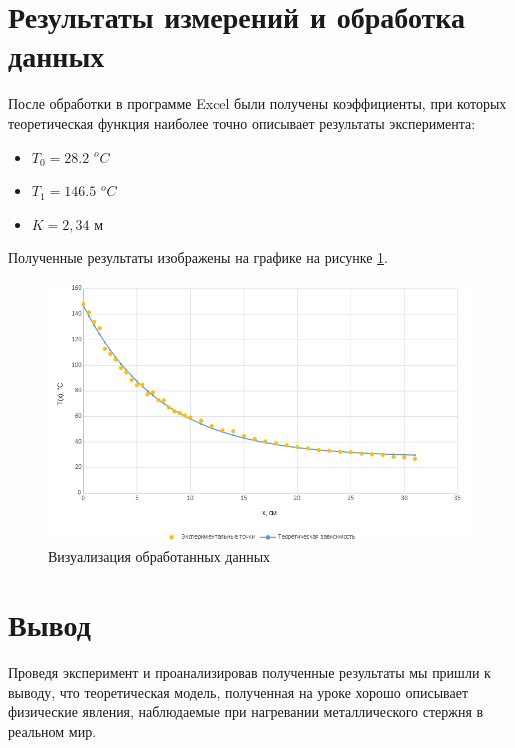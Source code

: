 \documentclass[a4paper,12pt]{article}
\begin{document}
\section{Результаты измерений и обработка данных}

После обработки в программе Excel были получены коэффициенты, при которых теоретическая функция наиболее точно описывает результаты эксперимента:
\begin{itemize}
\item $T_0 = 28.2$ $^oC$
\item $T_1 = 146.5$ $^oC$
\item $K = 2,34$ м
\end{itemize}

Полученные результаты изображены на графике на рисунке \ref{fig:viz}.

\begin{figure}[H]
\centering
\includegraphics[width=1.1\textwidth]{chart}
\caption{Визуализация обработанных данных}
\label{fig:viz}
\end{figure}

\section{Вывод}


Проведя эксперимент и проанализировав полученные результаты мы пришли к выводу, что теоретическая модель, полученная на уроке хорошо описывает физические явления, наблюдаемые при нагревании металлического стержня в реальном мир.
\end{document}
